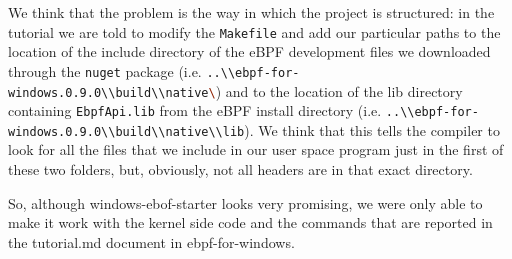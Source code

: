 We think that the problem is the way in which the project is structured: in the tutorial we are told to modify the \colorbox{backcolour}{\lstinline[style=commandline, language=bash, breaklines=true]|Makefile|} and add our particular paths to the location of the include directory of the eBPF development files we downloaded through the \colorbox{backcolour}{\lstinline[style=commandline, language=bash, breaklines=true]|nuget|} package (i.e. \colorbox{backcolour}{\lstinline[style=commandline, language=bash, breaklines=true]|..\\ebpf-for-windows.0.9.0\\build\\native\|}) and to the location of the lib directory containing \colorbox{backcolour}{\lstinline[style=commandline, language=bash, breaklines=true]|EbpfApi.lib|} from the eBPF install directory (i.e. \colorbox{backcolour}{\lstinline[style=commandline, language=bash, breaklines=true]|..\\ebpf-for-windows.0.9.0\\build\\native\\lib|}).
We think that this tells the compiler to look for all the files that we include in our user space program just in the first of these two folders, but, obviously, not all headers are in that exact directory.

So, although windows-ebof-starter looks very promising, we were only able to make it work with the kernel side code and the commands that are reported in the tutorial.md document in ebpf-for-windows.

